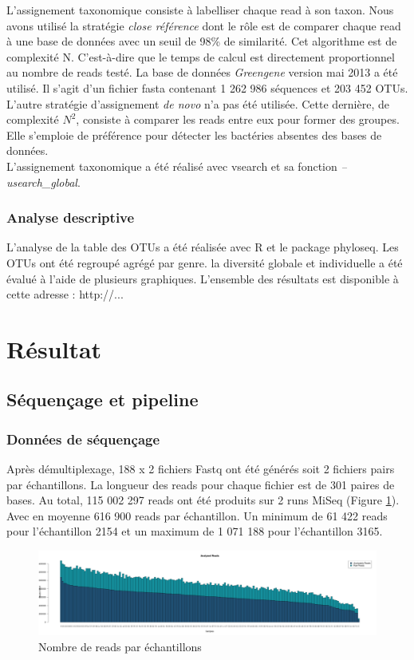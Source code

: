 \documentclass[12pt,a4paper]{article}
\begin{document}
L’assignement taxonomique consiste à labelliser chaque read à son taxon. Nous avons utilisé la stratégie \textit{close référence} dont le rôle est de comparer chaque read à une base de données avec un seuil de 98\% de similarité. Cet algorithme est de complexité N. C'est-à-dire que le temps de calcul est directement proportionnel au nombre de reads testé. La base de données \textit{Greengene} version mai 2013  a été utilisé. Il s'agit d'un fichier fasta contenant 1 262 986 séquences et 203 452 OTUs. \\
L'autre stratégie d'assignement \textit{de novo} n'a pas été utilisée. Cette dernière, de complexité $N^{2}$, consiste à comparer les reads entre eux pour former des groupes. Elle s'emploie de préférence pour détecter les bactéries absentes des bases de données. \\
L'assignement taxonomique a été réalisé avec vsearch et sa fonction \textit{--usearch\_global}. 

\subsubsection{Analyse descriptive}
L'analyse de la table des OTUs a été réalisée avec R et le package phyloseq. 
Les OTUs ont été regroupé agrégé par genre.
la diversité globale et individuelle a été évalué à l'aide de plusieurs graphiques. L'ensemble des résultats est disponible à cette adresse : http://...  



\section{Résultat}
\subsection{Séquençage et pipeline}
\subsubsection{Données de séquençage}
Après démultiplexage, 188 x 2 fichiers Fastq ont été générés soit 2 fichiers pairs par échantillons.
La longueur des reads pour chaque fichier est de 301 paires de bases.
Au total, 115 002 297 reads ont été produits sur 2 runs MiSeq (Figure \ref{readcount}). Avec en moyenne 616 900 reads par échantillon. Un minimum de 61 422 reads pour l’échantillon 2154 et un maximum de 1 071 188 pour l’échantillon 3165. 


\begin{figure}[ht]
\begin{center}
\includegraphics[scale=0.25]{img/pipeline.png}\hfill
\end{center}
\caption{Nombre de reads par échantillons}
\label{readcount}
\end{figure}
\end{document}
